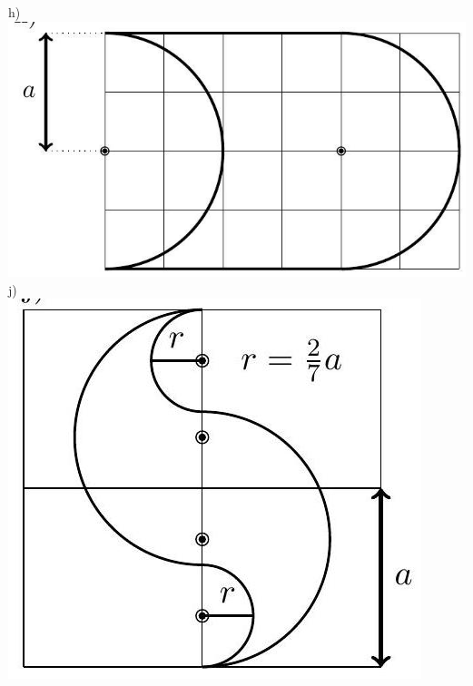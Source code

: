 \documentclass[10pt]{article}
\begin{document}
\begin{enumerate}
h)\\
\includegraphics[max width=\textwidth, center]{2024_11_21_e9b4faa005d5be2cc318g-061(5)}\\
j)\\
\includegraphics[max width=\textwidth, center]{2024_11_21_e9b4faa005d5be2cc318g-061}\\

\end{enumerate}
\end{document}
